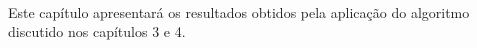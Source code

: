 \paragraph{}Este capítulo apresentará os resultados obtidos pela aplicação do algoritmo discutido nos capítulos 3 e 4.